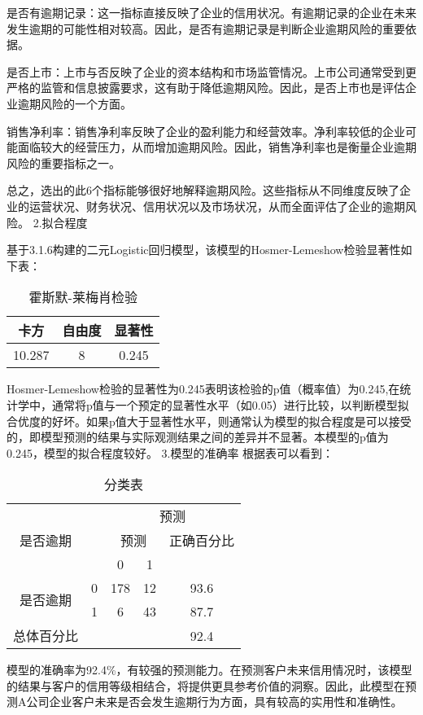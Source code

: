   是否有逾期记录：这一指标直接反映了企业的信用状况。有逾期记录的企业在未来发生逾期的可能性相对较高。因此，是否有逾期记录是判断企业逾期风险的重要依据。
  
  是否上市：上市与否反映了企业的资本结构和市场监管情况。上市公司通常受到更严格的监管和信息披露要求，这有助于降低逾期风险。因此，是否上市也是评估企业逾期风险的一个方面。
  
  销售净利率：销售净利率反映了企业的盈利能力和经营效率。净利率较低的企业可能面临较大的经营压力，从而增加逾期风险。因此，销售净利率也是衡量企业逾期风险的重要指标之一。

总之，选出的此6个指标能够很好地解释逾期风险。这些指标从不同维度反映了企业的运营状况、财务状况、信用状况以及市场状况，从而全面评估了企业的逾期风险。
2.拟合程度

基于3.1.6构建的二元Logistic回归模型，该模型的Hosmer-Lemeshow检验显著性如下表：
\begin{table}[h]
	\caption{霍斯默-莱梅肖检验}
	\label{tab:papercomponents}
	\centering
	\begin{tabular}{ccc}
		\toprule
		卡方 & 自由度 & 显著性 \\
		\midrule
		10.287 &  8  &  0.245 \\
		\bottomrule
	\end{tabular}
\end{table}


Hosmer-Lemeshow检验的显著性为0.245表明该检验的p值（概率值）为0.245,在统计学中，通常将p值与一个预定的显著性水平（如0.05）进行比较，以判断模型拟合优度的好坏。如果p值大于显著性水平，则通常认为模型的拟合程度是可以接受的，即模型预测的结果与实际观测结果之间的差异并不显著。本模型的p值为0.245，模型的拟合程度较好。
3.模型的准确率
根据表可以看到：
\begin{table}[h]
	\caption{分类表}
	\label{tab:papercomponents}
	\centering
	\begin{tabular}{ccccc}
		\toprule   
		\multirow{3}{*}{是否逾期}& &\multicolumn{3}{c}{预测} \\
		& & \multicolumn{2}{c}{预测}&正确百分比 \\
		& & 0&1& \\
		\midrule
		\multirow{2}{*}{是否逾期} &  0  &  178&12&93.6 \\
		 &  1  &  6&43&87.7 \\
		总体百分比  &     &   & &92.4 \\
		\bottomrule
	\end{tabular}
\end{table}

模型的准确率为92.4\%，有较强的预测能力。在预测客户未来信用情况时，该模型的结果与客户的信用等级相结合，将提供更具参考价值的洞察。因此，此模型在预测A公司企业客户未来是否会发生逾期行为方面，具有较高的实用性和准确性。

